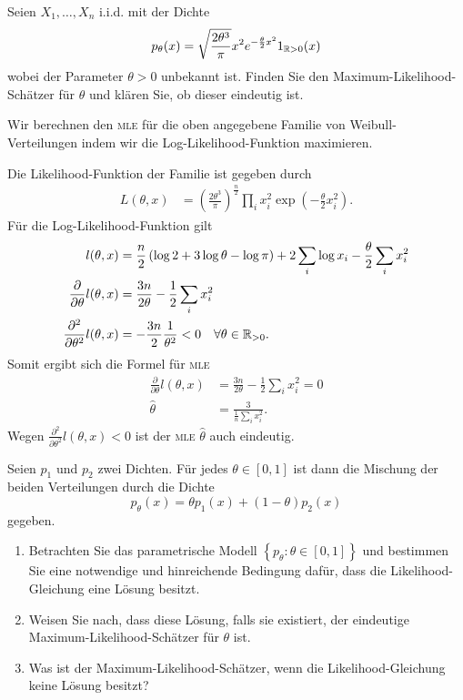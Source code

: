  Seien $X_1,\ldots,X_n$ i.i.d.
mit der Dichte 
\begin{equation*}
	p_\theta(x)=
	\sqrt{\frac{2\theta^3}{\pi}} x^2 e^{ - \frac{\theta}{2}x^2} 1_{\mathbb R>0}(x)
\end{equation*}
wobei der Parameter $\theta>0$ unbekannt ist. Finden Sie
den Maximum-Likelihood-Schätzer für $ \theta$ und klären Sie, ob dieser
eindeutig ist.

\solution Wir berechnen den \textsc{mle} für die oben angegebene Familie von Weibull-Verteilungen
indem wir die Log-Likelihood-Funktion maximieren. 

Die Likelihood-Funktion der Familie ist gegeben durch
\begin{align*}
	L(\theta, x) &= \left( \frac{2\theta^3}{\pi} \right)^\frac{n}{2} 
	\prod_i x_i^2 \exp\left( - \frac{\theta}{2}x_i^2 \right).
\end{align*}
Für die Log-Likelihood-Funktion gilt
\begin{align*}
	l(\theta,x) &= \frac{n}{2}\left( \log 2 + 3 \log \theta - \log \pi \right) + 2\sum_{i}^{} \log x_i - \frac{\theta}{2}\sum_{i}^{} x_i^2 \\
	\frac{\partial}{\partial \theta} l(\theta,x) &= 
	\frac{3n}{2 \theta}  - \frac{1}{2}\sum_{i}^{} x_i^2 \\
	\frac{\partial^2}{\partial \theta^2} l(\theta,x) &= - \frac{3n}{2} \frac{1}{\theta^2} < 0 \quad \forall \theta\in\mathbb R_{>0}.
\end{align*}
Somit ergibt sich die Formel für \textsc{mle} 
\begin{align*}
	\frac{\partial}{\partial \theta} l(\theta,x) &= \frac{3n}{2 \theta}  - \frac{1}{2}\sum_{i}^{} x_i^2 = 0 \\
	\hat\theta &=  \frac{3}{\frac{1}{n} \sum_{i}^{} x_i^2}.
\end{align*}
Wegen $ \frac{\partial^2}{\partial \theta^2} l(\theta,x) <0$ ist der \textsc{mle} $\hat\theta$ auch eindeutig.





Seien $p_1$ und $p_2$ zwei Dichten. Für jedes $\theta\in\left[ 0,1 \right]$ ist dann die Mischung
der beiden Verteilungen durch die Dichte
\begin{equation*}
	p_\theta(x) = \theta p_1(x) + (1-\theta)p_2(x)
\end{equation*}
gegeben. 
\begin{enumerate}
    \item Betrachten Sie das parametrische Modell $\left\{ p_\theta : \theta
        \in \left[ 0,1 \right] \right\}$ und bestimmen Sie eine notwendige und
        hinreichende Bedingung dafür, dass die Likelihood-Gleichung eine Lösung
        besitzt.
    \item Weisen Sie nach, dass diese Lösung, falls sie existiert, der
        eindeutige Maximum-Likelihood-Schätzer für $\theta$ ist.
    \item Was ist der Maximum-Likelihood-Schätzer, wenn die
        Likelihood-Gleichung keine Lösung besitzt?
\end{enumerate}

